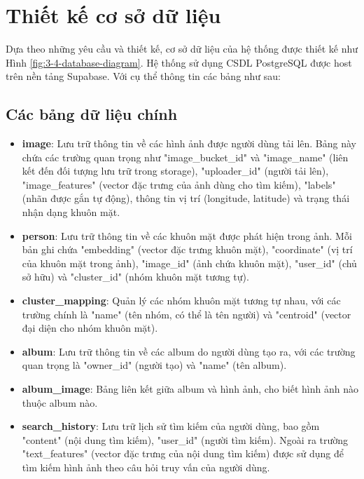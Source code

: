 \section{Thiết kế cơ sở dữ liệu}


Dựa theo những yêu cầu và thiết kế, cơ sở dữ liệu của hệ thống được thiết kế
như Hình \ref{fig:3-4-database-diagram}. Hệ thống sử dụng CSDL PostgreSQL được host trên nền tảng Supabase. Với cụ thể thông tin các bảng như sau: 
\subsection{Các bảng dữ liệu chính}
\begin{itemize}
    \item \textbf{image}: Lưu trữ thông tin về các hình ảnh được người dùng tải lên. Bảng này chứa các trường quan trọng như "image\_bucket\_id" và "image\_name" (liên kết đến đối tượng lưu trữ trong storage), "uploader\_id" (người tải lên), "image\_features" (vector đặc trưng của ảnh dùng cho tìm kiếm), "labels" (nhãn được gắn tự động), thông tin vị trí (longitude, latitude) và trạng thái nhận dạng khuôn mặt.
    
    \item \textbf{person}: Lưu trữ thông tin về các khuôn mặt được phát hiện trong ảnh. Mỗi bản ghi chứa "embedding" (vector đặc trưng khuôn mặt), "coordinate" (vị trí của khuôn mặt trong ảnh), "image\_id" (ảnh chứa khuôn mặt), "user\_id" (chủ sở hữu) và "cluster\_id" (nhóm khuôn mặt tương tự).
    
    \item \textbf{cluster\_mapping}: Quản lý các nhóm khuôn mặt tương tự nhau, với các trường chính là "name" (tên nhóm, có thể là tên người) và "centroid" (vector đại diện cho nhóm khuôn mặt).
    
    \item \textbf{album}: Lưu trữ thông tin về các album do người dùng tạo ra, với các trường quan trọng là "owner\_id" (người tạo) và "name" (tên album).
    
    \item \textbf{album\_image}: Bảng liên kết giữa album và hình ảnh, cho biết hình ảnh nào thuộc album nào.
    
    \item \textbf{search\_history}: Lưu trữ lịch sử tìm kiếm của người dùng, bao gồm "content" (nội dung tìm kiếm), "user\_id" (người tìm kiếm). Ngoài ra trường "text\_features" (vector đặc trưng của nội dung tìm kiếm) được sử dụng để tìm kiếm hình ảnh theo câu hỏi truy vấn của người dùng. 
    

\end{itemize}
